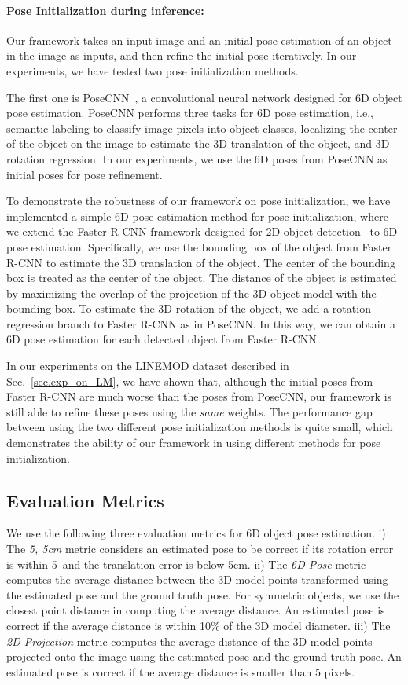 \documentclass[twocolumn]{svjour3}
\begin{document}
\paragraph{Pose Initialization during inference:}
Our framework takes an input image and an initial pose estimation of an object in the image as inputs, and then refine the initial pose iteratively. In our experiments, we have tested two pose initialization methods.

The first one is PoseCNN~\citep{xiang2017posecnn}, a convolutional neural network designed for 6D object pose estimation. PoseCNN performs three tasks for 6D pose estimation, i.e., semantic labeling to classify image pixels into object classes, localizing the center of the object on the image to estimate the 3D translation of the object, and 3D rotation regression. In our experiments, we use the 6D poses from PoseCNN as initial poses for pose refinement.

To demonstrate the robustness of our framework on pose initialization, we have implemented a simple 6D pose estimation method for pose initialization, where we extend the Faster R-CNN framework designed for 2D object detection~\citep{faster} to 6D pose estimation. Specifically, we use the bounding box of the object from Faster R-CNN to estimate the 3D translation of the object. The center of the bounding box is treated as the center of the object. The distance of the object is estimated by maximizing the overlap of the projection of the 3D object model with the bounding box. To estimate the 3D rotation of the object, we add a rotation regression branch to Faster R-CNN as in PoseCNN. In this way, we can obtain a 6D pose estimation for each detected object from Faster R-CNN.

In our experiments on the LINEMOD dataset described in Sec.~\ref{sec.exp_on_LM}, we have shown that, although the initial poses from Faster R-CNN are much worse than the poses from PoseCNN, our framework is still able to refine these poses using the \emph{same} weights. The performance gap between using the two different pose initialization methods is quite small, which demonstrates the ability of our framework in using different methods for pose initialization. 

\subsection{Evaluation Metrics}
\label{sec:appendix_eval_metrics}
We use the following three evaluation metrics for 6D object pose estimation. i) The \emph{5\degree, 5cm} metric considers an estimated pose to be correct if its rotation error is within 5\degree \ and the translation error is below 5cm. ii) The \emph{6D Pose} metric~\citep{hinterstoisser2012accv} computes the average distance between the 3D model points transformed using the estimated pose and the ground truth pose. For symmetric objects, we use the closest point distance in computing the average distance. An estimated pose is correct if the average distance is within 10\% of the 3D model diameter. iii) The \emph{2D Projection} metric computes the average distance of the 3D model points projected onto the image using the estimated pose and the ground truth pose. An estimated pose is correct if the average distance is smaller than 5 pixels. 
\end{document}

